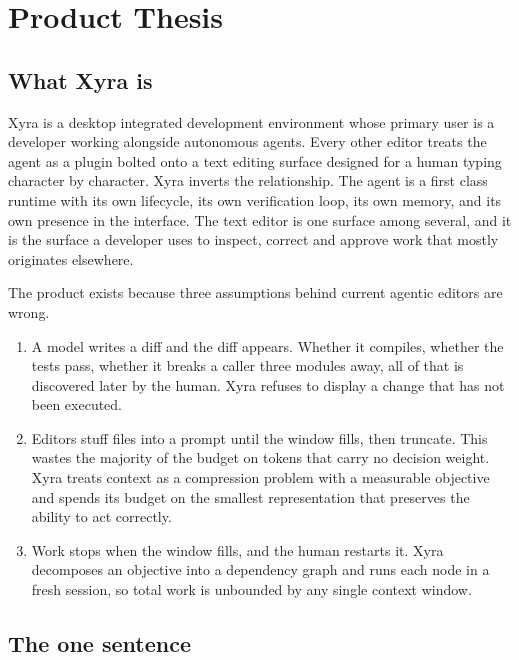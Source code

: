 \chapter{Product Thesis}
\label{ch:thesis}

\section{What Xyra is}

Xyra is a desktop integrated development environment whose primary user is a developer
working alongside autonomous agents. Every other editor treats the agent as a plugin
bolted onto a text editing surface designed for a human typing character by character.
Xyra inverts the relationship. The agent is a first class runtime with its own lifecycle,
its own verification loop, its own memory, and its own presence in the interface. The text
editor is one surface among several, and it is the surface a developer uses to inspect,
correct and approve work that mostly originates elsewhere.

The product exists because three assumptions behind current agentic editors are wrong.

\begin{enumerate}
  \item {} A model writes a diff and the diff appears.
  Whether it compiles, whether the tests pass, whether it breaks a caller three modules
  away, all of that is discovered later by the human. Xyra refuses to display a change
  that has not been executed.

  \item {} Editors stuff files into a prompt until the
  window fills, then truncate. This wastes the majority of the budget on tokens that carry
  no decision weight. Xyra treats context as a compression problem with a measurable
  objective and spends its budget on the smallest representation that preserves the ability
  to act correctly.

  \item {} Work stops when the window fills, and the human
  restarts it. Xyra decomposes an objective into a dependency graph and runs each node in a
  fresh session, so total work is unbounded by any single context window.
\end{enumerate}

\section{The one sentence}

